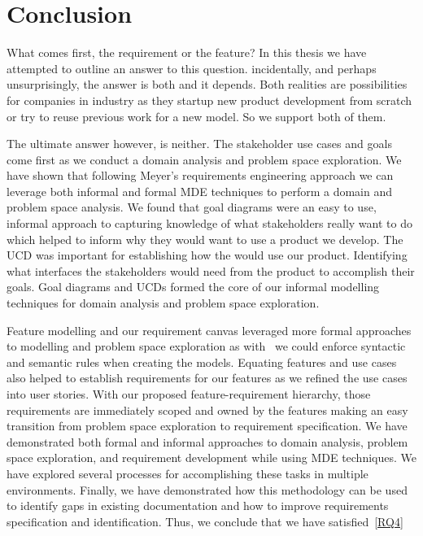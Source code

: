 \chapter{Conclusion}


What comes first, the requirement or the feature? In this thesis we have attempted to outline an answer to this question. incidentally, and perhaps unsurprisingly, the answer is both and it depends. Both realities are possibilities for companies in industry as they startup new product development from scratch or try to reuse previous work for a new model. So we support both of them. 

The ultimate answer however, is neither. The stakeholder use cases and goals come first as we conduct a domain analysis and problem space exploration. We have shown that following Meyer's requirements engineering approach we can leverage both informal and formal \ac{MDE} techniques to perform a domain and problem space analysis. We found that goal diagrams were an easy to use, informal approach to capturing knowledge of what stakeholders really want to do which helped to inform why they would want to use a product we develop. The \ac{UCD} was important for establishing how the would use our product. Identifying what interfaces the stakeholders would need from the product to accomplish their goals. Goal diagrams and \ac{UCD}s formed the core of our informal modelling techniques for domain analysis and problem space exploration.

Feature modelling and our requirement canvas leveraged more formal approaches to modelling and problem space exploration as with \tool\ we could enforce syntactic and semantic rules when creating the models. Equating features and use cases also helped to establish requirements for our features as we refined the use cases into user stories. With our proposed feature-requirement hierarchy, those requirements are immediately scoped and owned by the features making an easy transition from problem space exploration to requirement specification. We have demonstrated both formal and informal approaches to domain analysis, problem space exploration, and requirement development while using \ac{MDE} techniques. We have explored several processes for accomplishing these tasks in multiple environments. Finally, we have demonstrated how this methodology can be used to identify gaps in existing documentation and how to improve requirements specification and identification. Thus, we conclude that we have satisfied~\ref{RQ4}





